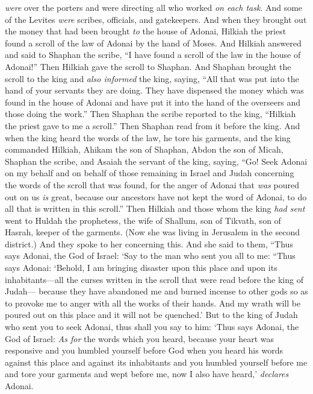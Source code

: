 \begin{biblechapter}
\verse \textit{were} over the porters and were directing all who worked \textit{on each task}. And some of the Levites \textit{were} scribes, officials, and gatekeepers.
\verse And when they brought out the money that had been brought \textit{to} the house of Adonai, Hilkiah the priest found a scroll of the law of Adonai by the hand of Moses.
\verse And Hilkiah answered and said to Shaphan the scribe, “I have found a scroll of the law in the house of Adonai!” Then Hilkiah gave the scroll to Shaphan.
\verse And Shaphan brought the scroll to the king and \textit{also informed} the king, saying, “All that was put into the hand of your servants they are doing.
\verse They have dispensed the money which was found in the house of Adonai and have put it into the hand of the overseers and those doing the work.”
\verse Then Shaphan the scribe reported to the king, “Hilkiah the priest gave to me a scroll.” Then Shaphan read from it before the king.
\verse And when the king heard the words of the law, he tore his garments,
\verse and the king commanded Hilkiah, Ahikam the son of Shaphan, Abdon the son of Micah, Shaphan the scribe, and Asaiah the servant of the king, saying,
\verse “Go! Seek Adonai on my behalf and on behalf of those remaining in Israel and Judah concerning the words of the scroll that was found, for the anger of Adonai that \textit{was} poured out on us \textit{is} great, because our ancestors have not kept the word of Adonai, to do all that is written in this scroll.”
\verse Then Hilkiah and those whom the king \textit{had sent} went to Huldah the prophetess, the wife of Shallum, son of Tikvath, son of Hasrah, keeper of the garments. (Now she was living in Jerusalem in the second district.) And they spoke to her concerning this.
\verse And she said to them, “Thus says Adonai, the God of Israel: ‘Say to the man who sent you all to me:
\verse “Thus says Adonai: ‘Behold, I am bringing disaster upon this place and upon its inhabitants—all the curses written in the scroll that were read before the king of Judah—
\verse because they have abandoned me and burned incense to other gods so as to provoke me to anger with all the works of their hands. And my wrath will be poured out on this place and it will not be quenched.’
\verse But to the king of Judah who sent you to seek Adonai, thus shall you say to him: ‘Thus says Adonai, the God of Israel: \textit{As for} the words which you heard,
\verse because your heart was responsive and you humbled yourself before God when you heard his words against this place and against its inhabitants and you humbled yourself before me and tore your garments and wept before me, now I also have heard,’ \textit{declares} Adonai.

\end{biblechapter}
